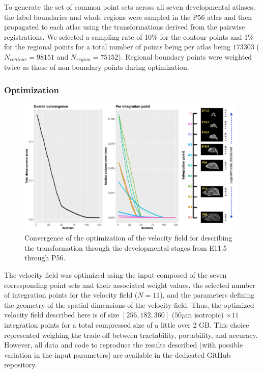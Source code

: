 \documentclass[
  12pt,
]{article}
\begin{document}
To generate the set of common point sets across all seven developmental
atlases, the label boundaries and whole regions were sampled in the P56
atlas and then propagated to each atlas using the transformations
derived from the pairwise registrations. We selected a sampling rate of
10\% for the contour points and 1\% for the regional points for a total
number of points being per atlas being \(173303\)
(\(N_{contour} = 98151\) and \(N_{region}=75152\)). Regional boundary
points were weighted twice as those of non-boundary points during
optimization.

\hypertarget{optimization}{%
\subsubsection{Optimization}\label{optimization}}

\begin{figure}[!htb]
\centering
\includegraphics[width=0.99\textwidth]{Figures/convergence.pdf}
\caption{Convergence of the optimization of the velocity field for describing the 
transformation through the developmental stages from E11.5 through P56.}
\label{fig:convergence}
\end{figure}

The velocity field was optimized using the input composed of the seven
corresponding point sets and their associated weight values, the
selected number of integration points for the velocity field (\(N=11\)),
and the parameters defining the geometry of the spatial dimensions of
the velocity field. Thus, the optimized velocity field described here is
of size \([256, 182, 360]\) (\(50 \mu\)m isotropic) \(\times 11\)
integration points for a total compressed size of a little over 2 GB.
This choice represented weighing the trade-off between tractability,
portability, and accuracy. However, all data and code to reproduce the
results described (with possible variation in the input parameters) are
available in the dedicated GitHub repository.
\end{document}
